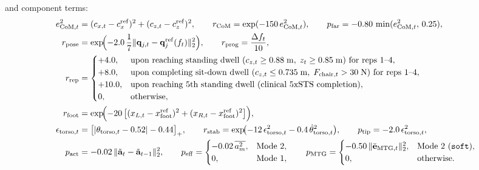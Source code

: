 and component terms:
\begin{align}
e_{\mathrm{CoM},t}^2 &= (c_{x,t} - c_x^{\mathrm{ref}})^2 + (c_{z,t} - c_z^{\mathrm{ref}})^2, \qquad
r_{\mathrm{CoM}} = \exp(-150\,e_{\mathrm{CoM},t}^2), \qquad
p_{\mathrm{far}} = -0.80\,\min(e_{\mathrm{CoM},t}^2,\, 0.25), \\
r_{\mathrm{pose}} &= \exp\!\Bigl(-2.0\,\frac{1}{7}\lVert \mathbf{q}_{j,t} - \mathbf{q}_{j}^{\mathrm{ref}}(f_t) \rVert_2^2\Bigr), \qquad
r_{\mathrm{prog}} = \frac{\Delta f_t}{10}, \\
r_{\mathrm{rep}} &=
\begin{cases}
+4.0, & \text{upon reaching standing dwell ($c_{z,t} \ge 0.88\;\mathrm{m},\; z_t \ge 0.85\;\mathrm{m}$) for reps 1--4}, \\
+8.0, & \text{upon completing sit-down dwell ($c_{z,t} \le 0.735\;\mathrm{m},\; F_{\mathrm{chair},t} > 30\;\mathrm{N}$) for reps 1--4}, \\
+10.0, & \text{upon reaching 5th standing dwell (clinical 5xSTS completion)}, \\
0, & \text{otherwise},
\end{cases} \\
r_{\mathrm{foot}} &= \exp\!\Bigl(-20\,\bigl[(x_{L,t} - x_{\mathrm{foot}}^{\mathrm{ref}})^2 + (x_{R,t} - x_{\mathrm{foot}}^{\mathrm{ref}})^2\bigr]\Bigr), \\
\epsilon_{\mathrm{torso},t} &= \bigl[|\theta_{\mathrm{torso},t} - 0.52| - 0.44\bigr]_+, \qquad
r_{\mathrm{stab}} = \exp\!\bigl(-12\,\epsilon_{\mathrm{torso},t}^2 - 0.4\,\dot{\theta}_{\mathrm{torso},t}^2\bigr), \qquad
p_{\mathrm{tip}} = -2.0\,\epsilon_{\mathrm{torso},t}^2, \\
p_{\mathrm{act}} &= -0.02\,\lVert \tilde{\mathbf{a}}_t - \tilde{\mathbf{a}}_{t-1} \rVert_2^2, \qquad
p_{\mathrm{eff}} =
\begin{cases}
-0.02\,\overline{a_m^2}, & \text{Mode 2}, \\
0, & \text{Mode 1},
\end{cases} \qquad
p_{\mathrm{MTG}} =
\begin{cases}
-0.50\,\lVert \bar{\mathbf{e}}_{\mathrm{MTG},t} \rVert_2^2, & \text{Mode 2 (\texttt{soft})}, \\
0, & \text{otherwise}.
\end{cases}
\end{align}
